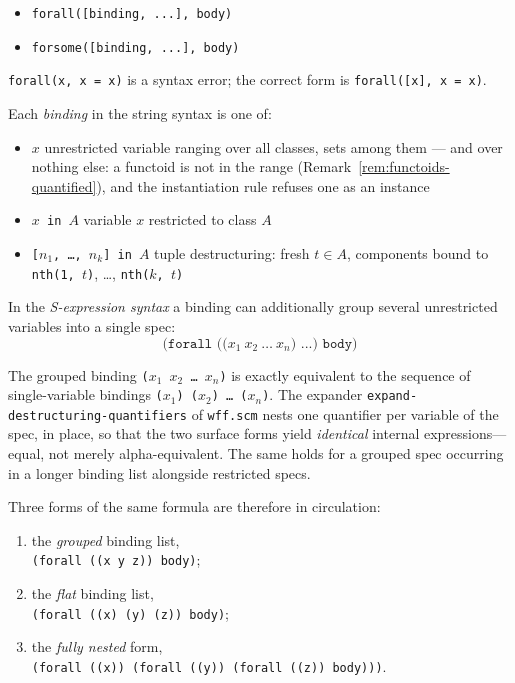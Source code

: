\begin{itemize}
\item \texttt{forall([binding, ...], body)}

\item \texttt{forsome([binding, ...], body)}
\end{itemize}

\noindent
\texttt{forall(x, x = x)} is a syntax error; the correct form is
\texttt{forall([x], x = x)}.

\noindent
Each \emph{binding} in the string syntax is one of:

\begin{itemize}
\item \texttt{$x$} unrestricted variable ranging over all classes, sets
  among them --- and over nothing else: a functoid is not in the range
  (Remark~\ref{rem:functoids-quantified}), and the instantiation rule
  refuses one as an instance
\item \texttt{$x$ in $A$} variable $x$ restricted to class $A$
\item \texttt{[$n_1$, \ldots, $n_k$] in $A$} tuple destructuring: fresh $t \in A$, components bound to \texttt{nth(1,~$t$)}, \ldots, \texttt{nth($k$,~$t$)}
\end{itemize}

\noindent
In the \emph{S-expression syntax} a binding can additionally group
several unrestricted variables into a single spec:
\[
  \texttt{(forall ((}x_1\ x_2\ \ldots\ x_n\texttt{) ...) body)}
\]
\begin{sloppypar}
The grouped binding \texttt{($x_1$ $x_2$ \ldots\ $x_n$)} is exactly
equivalent to the sequence of single-variable bindings
\texttt{($x_1$) ($x_2$) \ldots\ ($x_n$)}.  The expander
\texttt{expand-\allowbreak destructuring-\allowbreak quantifiers}
of \texttt{wff.scm} nests one
quantifier per variable of the spec, in place, so that the two surface
forms yield \emph{identical} internal expressions---equal, not merely
alpha-equivalent.  The same holds for a grouped spec occurring in a
longer binding list alongside restricted specs.
\end{sloppypar}

Three forms of the same formula are therefore in circulation:

\begin{enumerate}[label=(\arabic*),leftmargin=1.2cm]
\item the \emph{grouped} binding list,\\
      \texttt{(forall ((x y z)) body)};
\item the \emph{flat} binding list,\\
      \texttt{(forall ((x) (y) (z)) body)};
\item the \emph{fully nested} form,\\
      \texttt{(forall ((x)) (forall ((y)) (forall ((z)) body)))}.
\end{enumerate}

